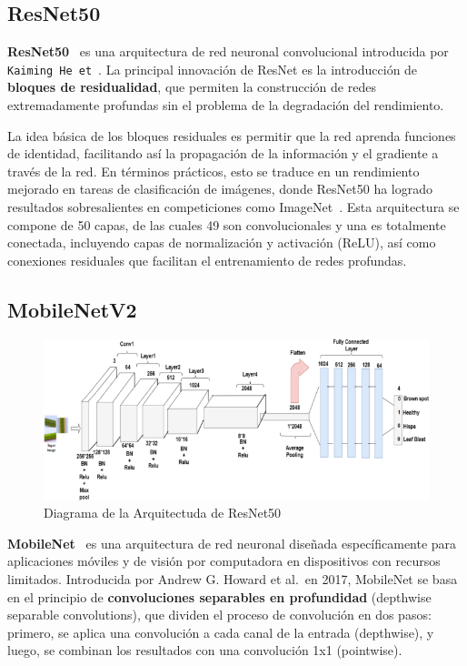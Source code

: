 \subsection{ResNet50}\label{subsec:resnet50}
\textbf{ResNet50}~\cite{ResNet50} es una arquitectura de red neuronal convolucional introducida por
\texttt{Kaiming He et}~\cite{heDeepResidualLearning2016}.
La principal innovación de ResNet es la introducción de \textbf{bloques de residualidad}, que permiten la construcción
de redes extremadamente profundas sin el problema de la degradación del rendimiento.


La idea básica de los bloques residuales es permitir que la red aprenda funciones de identidad, facilitando así la
propagación de la información y el gradiente a través de la red.
En términos prácticos, esto se traduce en un rendimiento mejorado en tareas de clasificación de imágenes, donde
ResNet50 ha logrado resultados sobresalientes en competiciones como ImageNet~\cite{alnuaimHumanComputerInteractionHand2022}.
Esta arquitectura se compone de 50 capas, de las cuales 49 son convolucionales y una es totalmente conectada,
incluyendo capas de normalización y activación (ReLU), así como conexiones residuales que facilitan el entrenamiento de
redes profundas.

\subsection{MobileNetV2}\label{subsec:mobilenet}

\begin{figure}[htp] \label{fig:resnet50}
    \begin{center}
        \includegraphics[width=1\textwidth]{imagenes/resnet50.png}
    \end{center}
    \caption[ResNet50]{Diagrama de la Arquitectuda de ResNet50}
\end{figure}

\textbf{MobileNet}~\cite{howardMobileNetsEfficientConvolutional2017} es una arquitectura de red neuronal diseñada específicamente para
aplicaciones móviles y de visión por computadora en dispositivos con recursos limitados.
Introducida por Andrew G. Howard et al.\ en 2017, MobileNet se basa en el principio de
\textbf{convoluciones separables en profundidad} (depthwise separable convolutions), que dividen el proceso de
convolución en dos pasos: primero, se aplica una convolución a cada canal de la entrada (depthwise), y luego, se
combinan los resultados con una convolución 1x1 (pointwise).



